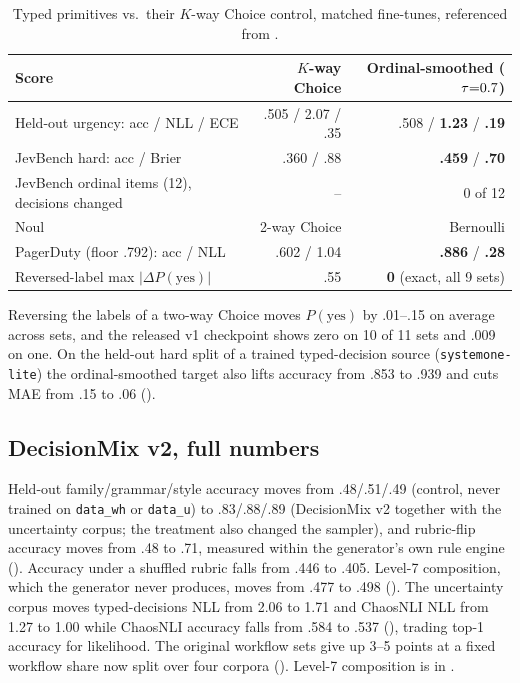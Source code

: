 \begin{table}[h]
  \centering
  \caption{Typed primitives vs.\ their $K$-way Choice control, matched fine-tunes, referenced from
  .}
  \label{tab:app-typed}
  \small
  \begin{tabular}{lrr}
    \toprule
    Score & $K$-way Choice & Ordinal-smoothed ($\tau{=}0.7$) \\
    \midrule
    Held-out urgency: acc / NLL / ECE & .505 / 2.07 / .35 & .508 / \textbf{1.23} / \textbf{.19} \\
    JevBench hard: acc / Brier & .360 / .88 & \textbf{.459} / \textbf{.70} \\
    JevBench ordinal items (12), decisions changed & -- & 0 of 12 \\
    \midrule
    Noul & 2-way Choice & Bernoulli \\
    \midrule
    PagerDuty (floor .792): acc / NLL & .602 / 1.04 & \textbf{.886} / \textbf{.28} \\
    Reversed-label max $|\Delta P(\mathrm{yes})|$ & .55 & \textbf{0} (exact, all 9 sets) \\
    \bottomrule
  \end{tabular}
\end{table}

Reversing the labels of a two-way Choice moves $P(\text{yes})$ by .01--.15 on average across sets,
and the released v1 checkpoint shows zero on 10 of 11 sets and .009 on one.
On the held-out hard split of a trained typed-decision source (\texttt{systemone-lite}) the
ordinal-smoothed target also lifts accuracy from .853 to .939 and cuts MAE from .15 to .06
().

\subsection{DecisionMix v2, full numbers}
\label{app:decisionmix}

Held-out family/grammar/style accuracy moves from .48/.51/.49 (control, never trained on
\texttt{data\_wh} or \texttt{data\_u}) to .83/.88/.89 (DecisionMix v2 together with the uncertainty
corpus; the treatment also changed the sampler), and rubric-flip accuracy moves from .48 to .71,
measured within the generator's own rule engine (). Accuracy under a shuffled
rubric falls from .446 to .405. Level-7 composition, which the generator never produces, moves from .477
to .498 (). The uncertainty corpus moves
typed-decisions NLL from 2.06 to 1.71 and ChaosNLI NLL from 1.27 to 1.00 while ChaosNLI accuracy falls
from .584 to .537 (), trading top-1 accuracy for likelihood. The original
workflow sets give up 3--5 points at a fixed workflow share now split over four corpora
(). Level-7 composition is in .

